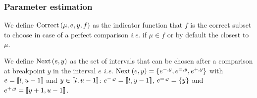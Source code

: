 \subsubsection{Parameter estimation}

\begin{definition}
    We define $\text{Correct}\left(\mu, e, y, f\right)$ as the indicator function that $f$ is the correct subset to choose in case of a perfect comparison \textit{i.e.} if $\mu \in f$ or by default the closest to $\mu$.
\end{definition}

\begin{definition}
    We define $\text{Next}\left(e, y\right)$ as the set of intervals that can be chosen after a comparison at breakpoint $y$ in the interval $e$ \textit{i.e.} $\text{Next}\left(e, y\right) = \left\{ e^{-,y}, e^{=,y}, e^{+,y} \right\}$ with $e = \left\llbracket l, u - 1\right\rrbracket$ and $y \in \left\llbracket l, u - 1\right\rrbracket$: $e^{-,y} = \left\llbracket l, y - 1\right\rrbracket$, $e^{=,y} = \left\{ y \right\}$ and $e^{+,y} = \left\llbracket y + 1, u - 1\right\rrbracket$.
\end{definition}

